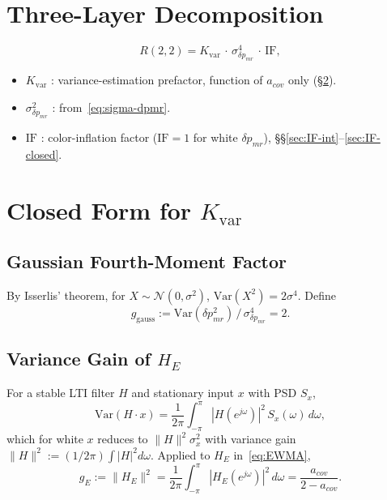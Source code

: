 \documentclass[11pt,a4paper]{ctexart}
\newcommand{\dpmr}{\delta p_{mr}}
\newcommand{\HE}{H_{E}}
\newcommand{\acov}{a_{cov}}
\newcommand{\Kvar}{K_{\mathrm{var}}}
\newcommand{\ggauss}{g_{\mathrm{gauss}}}
\newcommand{\gE}{g_{E}}
\newcommand{\IF}{\mathrm{IF}}
\begin{document}
\section{Three-Layer Decomposition}

\begin{equation}
R(2,2) = \Kvar\,\cdot\,\sigma^{4}_{\dpmr}\,\cdot\,\IF,
\label{eq:R22-decomp}
\end{equation}
\begin{itemize}[leftmargin=*,topsep=0pt,itemsep=0pt]
\item $\Kvar$ : variance-estimation prefactor, function of $\acov$ only (\S\ref{sec:Kvar}).
\item $\sigma^{2}_{\dpmr}$ : from~\eqref{eq:sigma-dpmr}.
\item $\IF$ : color-inflation factor ($\IF=1$ for white $\dpmr$), \S\S\ref{sec:IF-int}--\ref{sec:IF-closed}.
\end{itemize}

\section{Closed Form for $\Kvar$}
\label{sec:Kvar}

\subsection{Gaussian Fourth-Moment Factor}

By Isserlis' theorem, for $X\sim\mathcal{N}(0,\sigma^{2})$, $\mathrm{Var}(X^{2}) = 2\sigma^{4}$. Define
\begin{equation}
\ggauss := \mathrm{Var}(\dpmr^{2})\,/\,\sigma^{4}_{\dpmr} = 2.
\label{eq:ggauss}
\end{equation}

\subsection{Variance Gain of $\HE$}

For a stable LTI filter $H$ and stationary input $x$ with PSD $S_{x}$,
\begin{equation}
\mathrm{Var}(H\cdot x) = \frac{1}{2\pi}\!\!\int_{-\pi}^{\pi}\!\!|H(e^{j\omega})|^{2}\,S_{x}(\omega)\,d\omega,
\label{eq:univ-var}
\end{equation}
which for white $x$ reduces to $\|H\|^{2}\sigma^{2}_{x}$ with variance gain $\|H\|^{2}:=(1/2\pi)\int|H|^{2}d\omega$. Applied to $\HE$ in~\eqref{eq:EWMA},
\begin{equation}
\gE := \|\HE\|^{2}
     = \frac{1}{2\pi}\!\!\int_{-\pi}^{\pi}\!\!|\HE(e^{j\omega})|^{2}\,d\omega
     = \frac{\acov}{2-\acov}.
\label{eq:gE}
\end{equation}
\end{document}
